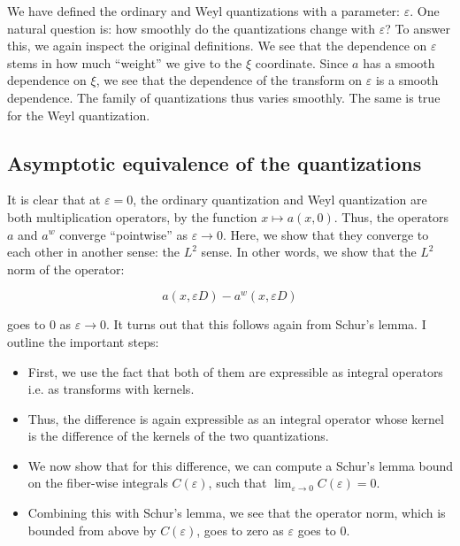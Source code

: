 \documentclass[a4paper]{amsart}
\begin{document}
We have defined the ordinary and Weyl quantizations with a parameter:
$\varepsilon$. One natural question is: how smoothly do the
quantizations change with $\varepsilon$? To answer this, we again
inspect the original definitions. We see that the dependence on
$\varepsilon$ stems in how much ``weight'' we give to the $\xi$
coordinate. Since $a$ has a smooth dependence on $\xi$, we see that
the dependence of the transform on $\varepsilon$ is a smooth
dependence. The family of quantizations thus varies smoothly. The same
is true for the Weyl quantization.

\subsection{Asymptotic equivalence of the quantizations}

It is clear that at $\varepsilon = 0$, the ordinary quantization and
Weyl quantization are both multiplication operators, by the function
$x \mapsto a(x,0)$. Thus, the operators $a$ and $a^w$ converge
``pointwise'' as $\varepsilon \to 0$. Here, we show that they converge
to each other in another sense: the $L^2$ sense. In other words, we show
that the $L^2$ norm of the operator:

$$a(x,\varepsilon D) - a^w(x,\varepsilon D)$$

goes to $0$ as $\varepsilon \to 0$. It turns out that this follows
again from Schur's lemma. I outline the important steps:

\begin{itemize}

\item First, we use the fact that both of them are expressible as
  integral operators i.e. as transforms with kernels.

\item Thus, the difference is again expressible as an integral
  operator whose kernel is the difference of the kernels of the two
  quantizations.

\item We now show that for this difference, we can compute a Schur's
  lemma bound on the fiber-wise integrals $C(\varepsilon)$, such that
  $\lim_{\varepsilon \to 0} C(\varepsilon) = 0$.
\item Combining this with Schur's lemma, we see that the operator
  norm, which is bounded from above by $C(\varepsilon)$, goes to zero
  as $\varepsilon$ goes to $0$.

\end{itemize}
\end{document}
